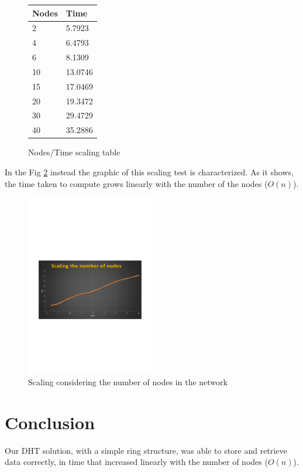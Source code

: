 \documentclass[11pt,conference]{IEEEtran}
\begin{document}
\begin{figure}[h!]
\centering
\caption{Nodes/Time scaling table}
\begin{tabular}[H]{ | l | l | }
\hline
	Nodes & Time \\ \hline
	2 & 5.7923 \\ \hline
	4 & 6.4793 \\ \hline
	6 & 8.1309 \\ \hline
	10 & 13.0746 \\ \hline
	15 & 17.0469 \\ \hline
	20 & 19.3472 \\ \hline
	30 & 29.4729 \\ \hline
	40 & 35.2886 \\ \hline
\end{tabular}
\label{tab:scaling}
\end{figure}

In the Fig \ref{fig:scaling} instead the graphic of this scaling test is characterized. As it shows, the time taken to compute grows linearly with the number of the nodes ($O(n)$).

\begin{figure}[h!]
  \centering
    \includegraphics[trim=0cm 9cm 0cm 11cm, width=0.5\textwidth]{scaling}
    \caption{Scaling considering the number of nodes in the network}
    \label{fig:scaling}
\end{figure}


\section{Conclusion}

Our DHT solution, with a simple ring structure, was able to store and retrieve
data correctly, in time that increased linearly with the number of nodes
($O(n)$).




\end{document}
